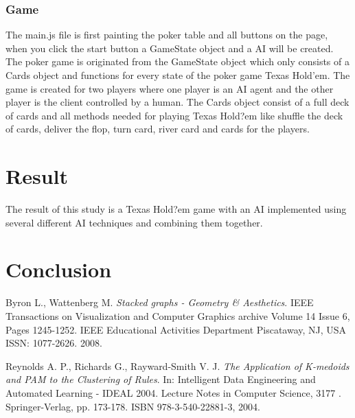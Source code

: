 \documentclass[journal]{vgtc}                %
\begin{document}
\subsubsection{Game}
The main.js file is first painting the poker table and all buttons on the page, when you click the start button a GameState object and a AI will be created.
The poker game is originated from the GameState object which only consists of a Cards object and functions for every state of the poker game Texas Hold'em. The game is created for two players where one player is an AI agent and the other player is the client controlled by a human. The Cards object consist of a full deck of cards and all methods needed for playing Texas Hold?em like shuffle the deck of cards, deliver the flop, turn card, river card and cards for the players.

\section{Result}
The result of this study is a Texas Hold?em game with an AI implemented using several different AI techniques and combining them together. 

\section{Conclusion}



\begin{thebibliography}{9}

  Byron L., Wattenberg M.
  \emph{Stacked graphs - Geometry \& Aesthetics}.
  IEEE Transactions on Visualization and Computer Graphics archive
Volume 14 Issue 6,
Pages 1245-1252. IEEE Educational Activities Department Piscataway, NJ, USA
ISSN: 1077-2626.
  2008.

  Reynolds A. P., Richards G., Rayward-Smith V. J.
  \emph{The Application of K-medoids and PAM to the Clustering of Rules}.
  In: Intelligent Data Engineering and Automated Learning - IDEAL 2004. Lecture Notes in Computer Science, 3177 . Springer-Verlag, pp. 173-178. ISBN 978-3-540-22881-3,
  2004.

\end{thebibliography}
\end{document}
